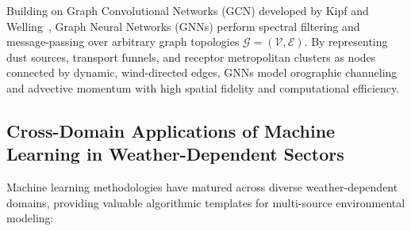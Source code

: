 Building on Graph Convolutional Networks (GCN) developed by Kipf and Welling~\cite{kipf2017semi}, Graph Neural Networks (GNNs) perform spectral filtering and message-passing over arbitrary graph topologies $\mathcal{G} = (\mathcal{V}, \mathcal{E})$. By representing dust sources, transport funnels, and receptor metropolitan clusters as nodes connected by dynamic, wind-directed edges, GNNs model orographic channeling and advective momentum with high spatial fidelity and computational efficiency.

\subsection{Cross-Domain Applications of Machine Learning in Weather-Dependent Sectors}
\label{subsec:cross_domain_ml}

Machine learning methodologies have matured across diverse weather-dependent domains, providing valuable algorithmic templates for multi-source environmental modeling:

